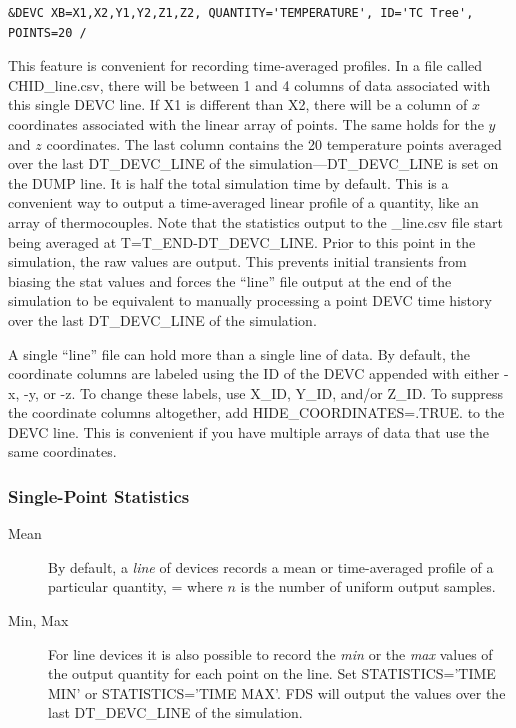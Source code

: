 \documentclass[11pt]{book}
\begin{document}
\begin{lstlisting}
&DEVC XB=X1,X2,Y1,Y2,Z1,Z2, QUANTITY='TEMPERATURE', ID='TC Tree', POINTS=20 /
\end{lstlisting}

\noindent This feature is convenient for recording time-averaged profiles. In a file called {\ct CHID\_line.csv}, there will be between 1 and 4 columns of data associated with this single {\ct DEVC} line. If {\ct X1} is different than {\ct X2}, there will be a column of $x$ coordinates associated with the linear array of points. The same holds for the $y$ and $z$ coordinates. The last column contains the 20 temperature points averaged over the last {\ct DT\_DEVC\_LINE} of the simulation---{\ct DT\_DEVC\_LINE} is set on the {\ct DUMP} line.  It is half the total simulation time by default. This is a convenient way to output a time-averaged linear profile of a quantity, like an array of thermocouples.  Note that the statistics output to the {\ct \_line.csv} file start being averaged at {\ct T=T\_END-DT\_DEVC\_LINE}.  Prior to this point in the simulation, the raw values are output.  This prevents initial transients from biasing the stat values and forces the ``line'' file output at the end of the simulation to be equivalent to manually processing a point {\ct DEVC} time history over the last {\ct DT\_DEVC\_LINE} of the simulation.

A single ``line'' file can hold more than a single line of data. By default, the coordinate columns are labeled using the {\ct ID} of the {\ct DEVC} appended with either {\ct -x}, {\ct -y}, or {\ct -z}. To change these labels, use {\ct X\_ID}, {\ct Y\_ID}, and/or {\ct Z\_ID}. To suppress the coordinate columns altogether, add {\ct HIDE\_COORDINATES=.TRUE.} to the {\ct DEVC} line. This is convenient if you have multiple arrays of data that use the same coordinates.

\subsubsection{Single-Point Statistics}

\begin{description}
\item[Mean] By default, a {\em line} of devices records a mean or time-averaged profile of a particular quantity,
\be
   \overline{\phi} = 
\ee
where $n$ is the number of uniform output samples.

\item[Min, Max] For line devices it is also possible to record the \emph{min} or the \emph{max} values of the output quantity for each point on the line.  Set {\ct STATISTICS='TIME MIN'} or {\ct STATISTICS='TIME MAX'}.  FDS will output the values over the last {\ct DT\_DEVC\_LINE} of the simulation.
\end{description}
\end{document}
